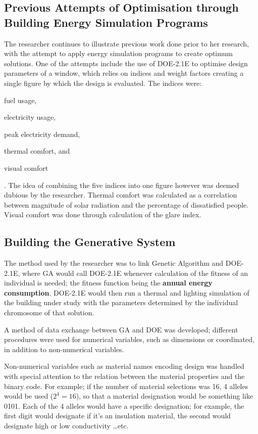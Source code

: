 \subsection{Previous Attempts of Optimisation through Building Energy Simulation Programs}

The researcher continues to illustrate previous work done prior to her research, with the attempt to apply energy simulation programs to create optimum solutions. One of the attempts include the use of DOE-2.1E to optimise design parameters of a window, which relies on indices and weight factors creating a single figure by which the design is evaluated. The indices were: \begin{inparaenum} \item fuel usage, \item electricity usage, \item peak electricity demand, \item thermal comfort, and \item visual comfort \end{inparaenum}. The idea of combining the five indices into one figure however was deemed dubious by the researcher. Thermal comfort was calculated as a correlation between magnitude of solar radiation and the percentage of dissatisfied people. Visual comfort was done through calculation of the glare index.

\subsection{Building the Generative System}

The method used by the researcher was to link Genetic Algorithm and DOE-2.1E, where GA would call DOE-2.1E whenever calculation of the fitness of an individual is needed; the fitness function being the \textbf{annual energy consumption}. DOE-2.1E would then run a thermal and lighting simulation of the building under study with the parameters determined by the individual chromosome of that solution. 

A method of data exchange between GA and DOE was developed; different procedures were used for numerical variables, such as dimensions or coordinated, in addition to non-numerical variables.

Non-numerical variables such as material names encoding design was handled with special attention to the relation between the material properties and the binary code. For example; if the number of material selections was 16, 4 alleles would be used ($2^4=16$), so that a material designation would be something like 0101. Each of the 4 alleles would have a specific designation; for example, the first digit would designate if it's an insulation material, the second would designate high or low conductivity \ldots\hspace{0cm}etc.

